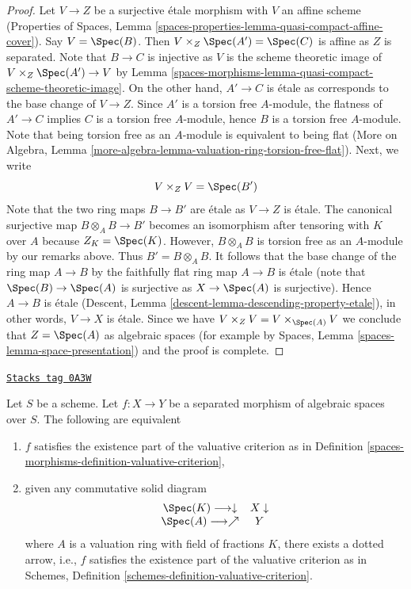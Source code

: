 \begin{proof}
\medskip\noindent
Let $V \to Z$ be a surjective \'etale morphism with $V$ an
affine scheme (Properties of Spaces, Lemma
\ref{spaces-properties-lemma-quasi-compact-affine-cover}).
Say $V = \Spec(B)$. Then $V \times_Z \Spec(A') = \Spec(C)$
is affine as $Z$ is separated. Note that $B \to C$ is injective
as $V$ is the scheme theoretic image of $V \times_Z \Spec(A') \to V$
by Lemma \ref{spaces-morphisms-lemma-quasi-compact-scheme-theoretic-image}.
On the other hand, $A' \to C$ is \'etale as corresponds
to the base change of $V \to Z$.
Since $A'$ is a torsion free $A$-module,
the flatness of $A' \to C$ implies $C$ is a torsion free
$A$-module, hence $B$ is a torsion free $A$-module.
Note that being torsion free as an $A$-module is
equivalent to being flat (More on Algebra, Lemma
\ref{more-algebra-lemma-valuation-ring-torsion-free-flat}).
Next, we write
$$
V \times_Z V = \Spec(B')
$$
Note that the two ring maps $B \to B'$ are \'etale as $V \to Z$
is \'etale. The canonical surjective map $B \otimes_A B \to B'$
becomes an isomorphism after tensoring with $K$ over $A$
because $Z_K = \Spec(K)$. However, $B \otimes_A B$ is torsion
free as an $A$-module by our remarks above. Thus $B' = B \otimes_A B$.
It follows that the base change of the ring map
$A \to B$ by the faithfully flat ring map $A \to B$
is \'etale (note that $\Spec(B) \to \Spec(A)$ is surjective
as $X \to \Spec(A)$ is surjective). Hence $A \to B$ is
\'etale (Descent, Lemma \ref{descent-lemma-descending-property-etale}),
in other words, $V \to X$ is \'etale.
Since we have $V \times_Z V = V \times_{\Spec(A)} V$
we conclude that $Z = \Spec(A)$ as algebraic spaces
(for example by Spaces, Lemma \ref{spaces-lemma-space-presentation})
and the proof is complete.
\end{proof}

\begin{lemma}
\label{spaces-morphisms-lemma-usual-enough}
\href{https://stacks.math.columbia.edu/tag/0A3W}{\texttt{Stacks tag 0A3W}}

Let $S$ be a scheme. Let $f : X \to Y$ be a separated morphism of
algebraic spaces over $S$. The following are equivalent
\begin{enumerate}
\item $f$ satisfies the existence part of the valuative criterion
as in Definition \ref{spaces-morphisms-definition-valuative-criterion},
\item given any commutative solid diagram
$$
\begin{array}{cc}\Spec(K) \longrightarrow\downarrow & X \downarrow \\ \Spec(A) \longrightarrow\nearrow & Y\end{array}
$$
where $A$ is a valuation ring with field of fractions $K$, there exists
a dotted arrow, i.e., $f$ satisfies the existence part of the valuative
criterion as in
Schemes, Definition \ref{schemes-definition-valuative-criterion}.
\end{enumerate}
\end{lemma}

